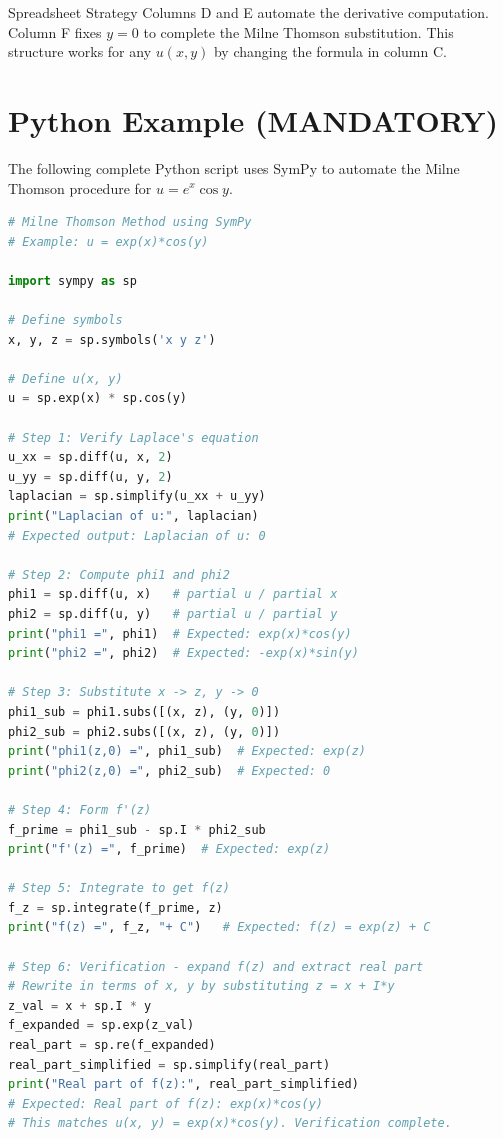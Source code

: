\documentclass[12pt,a4paper]{article}
\begin{document}
\begin{learnbox}{Spreadsheet Strategy}
Columns D and E automate the derivative computation. Column F fixes \( y = 0 \) to complete the Milne Thomson substitution. This structure works for any \( u(x,y) \) by changing the formula in column C.
\end{learnbox}

\section{Python Example (MANDATORY)}

The following complete Python script uses SymPy to automate the Milne Thomson procedure for \( u = e^x \cos y \).

\begin{lstlisting}[language=Python]
# Milne Thomson Method using SymPy
# Example: u = exp(x)*cos(y)

import sympy as sp

# Define symbols
x, y, z = sp.symbols('x y z')

# Define u(x, y)
u = sp.exp(x) * sp.cos(y)

# Step 1: Verify Laplace's equation
u_xx = sp.diff(u, x, 2)
u_yy = sp.diff(u, y, 2)
laplacian = sp.simplify(u_xx + u_yy)
print("Laplacian of u:", laplacian)
# Expected output: Laplacian of u: 0

# Step 2: Compute phi1 and phi2
phi1 = sp.diff(u, x)   # partial u / partial x
phi2 = sp.diff(u, y)   # partial u / partial y
print("phi1 =", phi1)  # Expected: exp(x)*cos(y)
print("phi2 =", phi2)  # Expected: -exp(x)*sin(y)

# Step 3: Substitute x -> z, y -> 0
phi1_sub = phi1.subs([(x, z), (y, 0)])
phi2_sub = phi2.subs([(x, z), (y, 0)])
print("phi1(z,0) =", phi1_sub)  # Expected: exp(z)
print("phi2(z,0) =", phi2_sub)  # Expected: 0

# Step 4: Form f'(z)
f_prime = phi1_sub - sp.I * phi2_sub
print("f'(z) =", f_prime)  # Expected: exp(z)

# Step 5: Integrate to get f(z)
f_z = sp.integrate(f_prime, z)
print("f(z) =", f_z, "+ C")   # Expected: f(z) = exp(z) + C

# Step 6: Verification - expand f(z) and extract real part
# Rewrite in terms of x, y by substituting z = x + I*y
z_val = x + sp.I * y
f_expanded = sp.exp(z_val)
real_part = sp.re(f_expanded)
real_part_simplified = sp.simplify(real_part)
print("Real part of f(z):", real_part_simplified)
# Expected: Real part of f(z): exp(x)*cos(y)
# This matches u(x, y) = exp(x)*cos(y). Verification complete.
\end{lstlisting}
\end{document}
